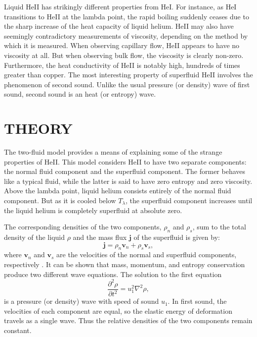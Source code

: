 \documentclass[prb,aps,twocolumn,showpacs,10pt]{revtex4-1}
\begin{document}
Liquid HeII has strikingly different properties from HeI. For instance, as HeI transitions to HeII at the lambda point, the rapid boiling suddenly ceases due to the sharp increase of the heat capacity of liquid helium. HeII may also have seemingly contradictory measurements of viscosity, depending on the method by which it is measured. When observing capillary flow, HeII appears to have no viscosity at all. But when observing bulk flow, the viscosity is clearly non-zero. Furthermore, the heat conductivity of HeII is notably high, hundreds of times greater than copper. The most interesting property of superfluid HeII involves the phenomenon of second sound. Unlike the usual pressure (or density) wave of first sound, second sound is an heat (or entropy) wave. \cite{stanford}


\section{THEORY}


The two-fluid model provides a means of explaining some of the strange properties of HeII. This model considers HeII to have two separate components: the normal fluid component and the superfluid component. The former behaves like a typical fluid, while the latter is said to have zero entropy and zero viscosity. Above the lambda point, liquid helium consists entirely of the normal fluid component. But as it is cooled below $T_\lambda$, the superfluid component increases until the liquid helium is completely superfluid at absolute zero.  


The corresponding densities of the two components, $\rho_n$ and $\rho_s$, sum to the total density of the liquid $\rho$ and the mass flux $\mathbf{j}$ of the superfluid is given by:
\begin{equation}
\mathbf{j}=\rho_n \mathbf{v}_n+\rho_s \mathbf{v}_s,
\end{equation}
where $\mathbf{v}_n$ and $\mathbf{v}_s$ are the velocities of the normal and superfluid components, respectively \cite{stanford}. It can be shown that mass, momentum, and entropy conservation produce two different wave equations. The solution to the first equation
\begin{equation}
\frac{\partial^2\rho}{\partial t^2} = u_1^2 \nabla^2 \rho,
\end{equation}
is a pressure (or density) wave with speed of sound $u_1$. In first sound, the velocities of each component are equal, so the elastic energy of deformation travels as a single wave. Thus the relative densities of the two components remain constant.\\
\end{document}
